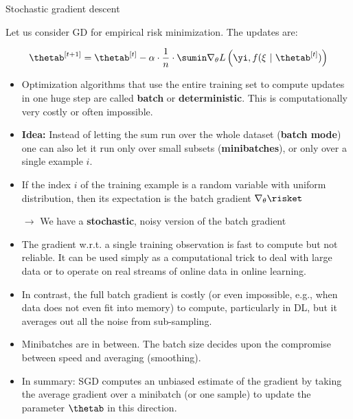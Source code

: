 \begin{vbframe}{Stochastic gradient descent}

Let us consider GD for empirical risk minimization. The updates are: 

$$
  \thetab^{[t + 1]} = \thetab^{[t]} - \alpha \cdot \frac{1}{n} \cdot \sumin \nabla_\theta L\left(\yi, f(\xi ~|~ \thetab^{[t]})\right)
$$


  \begin{itemize}
    \item Optimization algorithms that use the entire training set to compute updates in one huge step are called \textbf{batch} or \textbf{deterministic}. This is computationally very costly or often impossible. 
    \item \textbf{Idea:} Instead of letting the sum run over the whole dataset (\textbf{batch mode}) one can also let it run only over small subsets (\textbf{minibatches}), or only over a single example $i$. 
     \item If the index $i$ of the training example is a random variable with uniform distribution, then its expectation is the batch gradient $\nabla_\theta \risket$
    \item[$\to$] We have a \textbf{stochastic}, noisy version of the batch gradient

    \framebreak 

    \item The gradient w.r.t. a single training observation is fast to compute but not reliable. It can be used simply as a computational trick to deal with large data or to operate on real streams of online data in online learning.
    \item In contrast, the full
    batch gradient is costly (or even impossible, e.g., when data does not even fit into memory) to compute, particularly in DL, but it averages out all the noise from sub-sampling.
    \item Minibatches are in between. The batch size decides upon the compromise
    between speed and averaging (smoothing).
    \item In summary: SGD computes an unbiased estimate of the gradient by taking the average gradient over a minibatch (or one sample) to update the parameter $\thetab$ in this direction.
  \end{itemize}
 


\end{vbframe}
